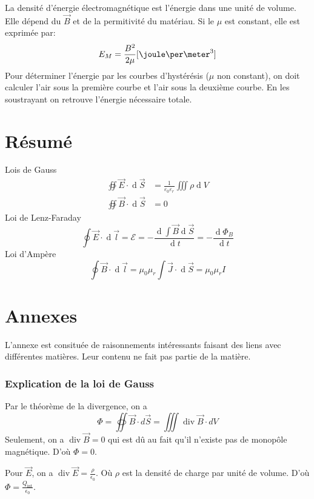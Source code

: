 \documentclass[11pt,a4paper]{article}
\newcommand{\B}{\vec B}
\newcommand{\EMF}{\mathcal{E}}
\DeclareMathOperator{\newdiv}{div}
\DeclareMathOperator{\diff}{d}
\newcommand{\dif}{\diff\!}
\begin{document}
La densité d'énergie électromagnétique est l'énergie dans une unité de volume.
Elle dépend du $\B$ et de la permitivité du matériau.
Si le $\mu$ est constant, elle est exprimée par:
$$E_M =  \frac{B^2}{2\mu} [\joule\per\meter^3]$$
Pour déterminer l'énergie par les courbes d'hystérésis ($\mu$ non constant), on doit calculer l'air sous la première courbe et l'air sous la deuxième courbe.
En les soustrayant on retrouve l'énergie nécessaire totale.

\part{Résumé}
Lois de Gauss
\begin{align*}
	\oiint \vec E \cdot \dif \vec S &= \frac{1}{\varepsilon_0\varepsilon_r}\iiint \rho \dif V\\
	\oiint \B \cdot \dif \vec S &= 0
\end{align*}
Loi de Lenz-Faraday
\[ \oint \vec E \cdot \dif \vec l = \EMF = - \frac{\dif \int \B \dif \vec S}{\dif t} = - \frac{\dif \Phi_B}{\dif t} \]
Loi d'Ampère
\[ \oint \B \cdot \dif \vec l = \mu_0\mu_r \int \vec J \cdot \dif \vec S = \mu_0\mu_r I \]

\appendix
\part{Annexes}
L'annexe est consituée de raisonnements intéressants faisant des liens avec différentes matières.
Leur contenu ne fait pas partie de la matière.
\section{Explication de la loi de Gauss}
\label{ann:gauss}
Par le théorème de la divergence, on a
\[ \Phi = \oiint \vec B \cdot d\vec S = \iiint \newdiv \vec B \cdot dV \]
Seulement, on a $\newdiv \vec B = 0$ qui est dû au fait qu'il n'existe pas de monopôle magnétique.
D'où $\Phi = 0$.

Pour $\vec E$, on a $\newdiv \vec E = \frac{\rho}{\epsilon_0}$.
Où $\rho$ est la densité de charge par unité de volume.
D'où $\Phi = \frac{Q_\mathrm{int}}{\epsilon_0}$.
\end{document}
